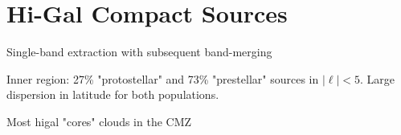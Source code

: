 \section{Hi-Gal Compact Sources}

Single-band extraction with subsequent band-merging

Inner region: 27\% "protostellar" and 73\% "prestellar" sources in $|\ell|<5$.
Large dispersion in latitude for both populations.

Most higal "cores" clouds in the CMZ